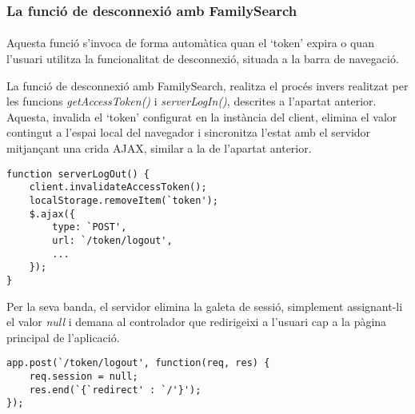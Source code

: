 \subsubsection{La funció de desconnexió amb FamilySearch}

\paragraph{}
Aquesta funció s'invoca de forma automàtica quan el `token' expira o quan l'usuari utilitza la funcionalitat de desconnexió, situada a la barra de navegació.

La funció de desconnexió amb FamilySearch, realitza el procés invers realitzat per les funcions \emph{getAccessToken()} i \emph{serverLogIn()}, descrites a l'apartat anterior. Aquesta, invalida el `token' configurat en la instància del client, elimina el valor contingut a l'espai local del navegador i sincronitza l'estat amb el servidor mitjançant una crida AJAX, similar a la de l'apartat anterior.

\begin{lstlisting}[style=rawOwn,caption={Cridar AJAX al servidor per indicar que l'usuari s'ha desconnectat}]
function serverLogOut() {
    client.invalidateAccessToken();
    localStorage.removeItem(`token');
    $.ajax({
        type: `POST',
        url: `/token/logout',
        ...
    });
}
\end{lstlisting}

Per la seva banda, el servidor elimina la galeta de sessió, simplement assignant-li el valor \emph{null} i demana al controlador que redirigeixi a l'usuari cap a la pàgina principal de l'aplicació.

\begin{lstlisting}[style=rawOwn,caption={Petició POST de desconnexió processada pel servidor}]
app.post(`/token/logout', function(req, res) {
    req.session = null;
    res.end(`{`redirect' : `/'}');
});
\end{lstlisting}
